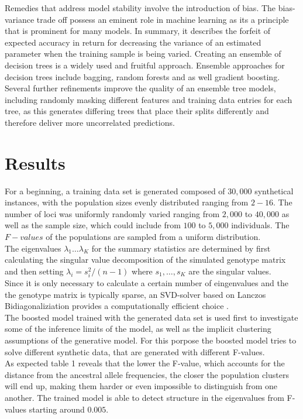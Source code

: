 \documentclass[a4paper, 11pt]{article}
\begin{document}
Remedies that address model stability involve the introduction of bias. The bias-variance trade off possess an eminent role in machine learning as its a principle that is prominent for many models. In summary, it describes the forfeit of expected accuracy in return for decreasing the variance of an estimated parameter when the training sample is being varied. Creating an ensemble of decision trees is a widely used and fruitful approach. Ensemble approaches for decision trees include bagging, random forests and as well gradient boosting. Several further refinements improve the quality of an ensemble tree models, including randomly masking different features and training data entries for each tree, as this generates differing trees that place their splits differently and therefore deliver more uncorrelated predictions.

\section{Results}
For a beginning, a training data set is generated composed of $30,000$ synthetical instances, with the population sizes evenly distributed ranging from $2-16$.
The number of loci was uniformly randomly varied ranging from $2,000$ to $40,000$ as well as the sample size, which could include from $100$ to $5,000$ individuals. The $F-values$ of the populations are sampled from a uniform distribution.\\
The eigenvalues $\lambda_1 \ldots \lambda_K$ for the summary statistics are determined by first calculating the singular value decomposition of the simulated genotype matrix and then setting $\lambda_i = s_i^2 / (n-1)$ where $s_1, \ldots, s_K$ are the singular values.\\
Since it is only necessary to calculate a certain number of eingenvalues and the the genotype matrix is typically sparse, an SVD-solver based on Lanczos Bidiagonaliziation provides a computationally efficient choice \parencite{golub1965calculating}.\\
The boosted model trained with the generated data set is used first to investigate some of the inference limits of the model, as well as the implicit clustering assumptions of the generative model. For this porpose the boosted model tries to solve different synthetic data, that are generated with different F-values.\\
As expected table 1 reveals that the lower the F-value, which accounts for the distance from the ancestral allele frequencies, the closer the population clusters will end up, making them harder or even impossible to distinguish from one another. The trained model is able to detect structure in the eigenvalues from F-values starting around $0.005$. 
\end{document}
